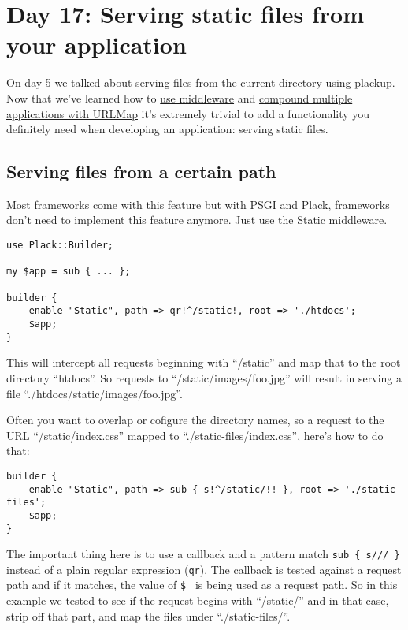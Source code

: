 \section{Day 17: Serving static files from your
application}\label{day-17-serving-static-files-from-your-application}

On
\href{http://advent.plackperl.org/2009/12/day-5-run-a-static-file-web-server-with-plack.html}{day
5} we talked about serving files from the current directory using
plackup. Now that we've learned how to
\href{http://advent.plackperl.org/2009/12/day-10-using-plack-middleware.html}{use
middleware} and
\href{http://advent.plackperl.org/2009/12/day-12-maps-multiple-apps-with-mount-and-urlmap.html}{compound
multiple applications with URLMap} it's extremely trivial to add a
functionality you definitely need when developing an application:
serving static files.

\subsection{Serving files from a certain
path}\label{serving-files-from-a-certain-path}

Most frameworks come with this feature but with PSGI and Plack,
frameworks don't need to implement this feature anymore. Just use the
Static middleware.

\begin{lstlisting}
use Plack::Builder;

my $app = sub { ... };

builder {
    enable "Static", path => qr!^/static!, root => './htdocs';
    $app;
}
\end{lstlisting}

This will intercept all requests beginning with ``/static'' and map that
to the root directory ``htdocs''. So requests to
``/static/images/foo.jpg'' will result in serving a file
``./htdocs/static/images/foo.jpg''.

Often you want to overlap or cofigure the directory names, so a request
to the URL ``/static/index.css'' mapped to ``./static-files/index.css'',
here's how to do that:

\begin{lstlisting}
builder {
    enable "Static", path => sub { s!^/static/!! }, root => './static-files';
    $app;
}
\end{lstlisting}

The important thing here is to use a callback and a pattern match
\lstinline!sub { s/// }! instead of a plain regular expression
(\lstinline!qr!). The callback is tested against a request path and if
it matches, the value of \lstinline!$_! is being used as a request path.
So in this example we tested to see if the request begins with
``/static/'' and in that case, strip off that part, and map the files
under ``./static-files/''.

